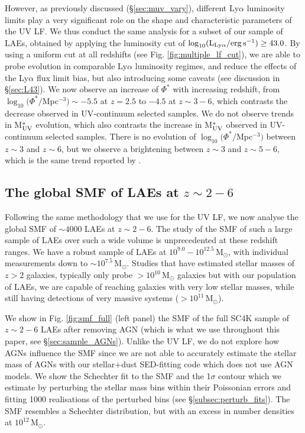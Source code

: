\documentclass[a4paper,fleqn,usenatbib]{mnras}
\begin{document}
However, as previously discussed (\S\ref{sec:muv_vary}), different Ly$\alpha$ luminosity limits play a very significant role on the shape and characteristic parameters of the UV LF. We thus conduct the same analysis for a subset of our sample of LAEs, obtained by applying the luminosity cut of $\log_{10} (\rm L_{Ly\alpha}/erg\,s^{-1}) \geq 43.0$. By using a uniform cut at all redshifts (see Fig. \ref{fig:multiple_lf_cut}), we are able to probe evolution in comparable Ly$\alpha$ luminosity regimes, and reduce the effects of the Ly$\alpha$ flux limit bias, but also introducing some caveats (see discussion in \S\ref{sec:L43}). We now observe an increase of $\Phi^*$ with increasing redshift, from $\log_{10}(\Phi^*/$Mpc$^{-3})\sim-5.5$ at $z=2.5$ to $-4.5$ at $z\sim3-6$, which contrasts the decrease observed in UV-continuum selected samples. We do not observe trends in M$_{\rm UV}^*$ evolution, which also contrasts the increase in M$_{\rm UV}^*$ observed in UV-continuum selected samples. There is no evolution of $\log_{10}(\Phi^*/$Mpc$^{-3})$ between $z\sim3$ and $z\sim6$, but we observe a brightening between $z\sim3$ and $z\sim5-6$, which is the same trend reported by \cite{Ouchi2008}.


\subsection{The global SMF of LAEs at $z\sim2-6$}

Following the same methodology that we use for the UV LF, we now analyse the global SMF of $\sim4000$ LAEs at $z\sim2-6$. The study of the SMF of such a large sample of LAEs over such a wide volume is unprecedented at these redshift ranges. We have a robust sample of LAEs at $10^{9.0}-10^{12.5}$\,M$_\odot$, with individual measurements down to $\sim10^{7.5}$\,M$_\odot$. Studies that have estimated stellar masses of $z>2$ galaxies, typically only probe $>10^{10}$\,M$_\odot$ galaxies \citep[e.g.][]{Schreiber2015} but with our population of LAEs, we are capable of reaching galaxies with very low stellar masses, while still having detections of very massive systems ($>10^{11}$\,M$_\odot$). 

We show in Fig. \ref{fig:smf_full} (left panel) the SMF of the full SC4K sample of $z\sim2-6$ LAEs after removing AGN (which is what we use throughout this paper, see \S\ref{sec:sample_AGNs}). Unlike the UV LF, we do not explore how AGNs influence the SMF since we are not able to accurately estimate the stellar mass of AGNs with our stellar$+$dust SED-fitting code which does not use AGN models. We show the Schechter fit to the SMF and the 1$\sigma$ contour which we estimate by perturbing the stellar mass bins within their Poissonian errors and fitting 1000 realisations of the perturbed bins (see \S\ref{subsec:perturb_fits}). The SMF resembles a Schechter distribution, but with an excess in number densities at $10^{12}$\,M$_\odot$.
\end{document}
